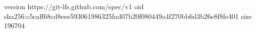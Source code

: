 version https://git-lfs.github.com/spec/v1
oid sha256:c5caff68cd8eee593061986325fad07b20f080449a4f270bb6d3b26e8f8fe401
size 196704
